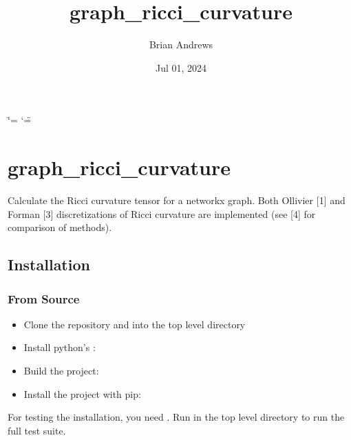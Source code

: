 \documentclass[letterpaper,10pt,english]{sphinxmanual}
\title{graph\_ricci\_curvature}
\date{Jul 01, 2024}
\author{Brian Andrews}
\begin{document}
\ifdefined\shorthandoff
  \ifnum\catcode`\=\string=\active\shorthandoff{=}\fi
  \ifnum\catcode`\"=\active{}\fi
\fi

\pagestyle{empty}
\sphinxmaketitle
\pagestyle{plain}
\sphinxtableofcontents
\pagestyle{normal}
\label{\detokenize{index::doc}}



\chapter{graph\_ricci\_curvature}
\label{\detokenize{index:graph-ricci-curvature}}
\sphinxAtStartPar
Calculate the Ricci curvature tensor for a networkx graph. Both Ollivier {[}1{]} and Forman {[}3{]} discretizations of Ricci curvature are implemented (see {[}4{]} for comparison of methods).


\section{Installation}
\label{\detokenize{index:installation}}

\subsection{From Source}
\label{\detokenize{index:from-source}}\begin{itemize}
\item {} 
\sphinxAtStartPar
Clone the repository and  into the top level directory

\item {} 
\sphinxAtStartPar
Install python’s : 

\item {} 
\sphinxAtStartPar
Build the project: 

\item {} 
\sphinxAtStartPar
Install the project with pip: 

\end{itemize}

\sphinxAtStartPar
For testing the installation, you need . Run  in the top level directory to run the full test suite.
\end{document}
